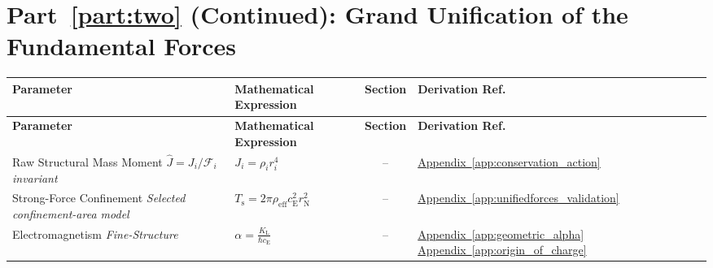\par\ifdim\dimexpr\pagegoal-\pagetotal\relax<12\baselineskip\newpage\fi
\section*{Part~\ref{part:two} (Continued): Grand Unification of the Fundamental Forces}

\vspace{0.5cm}
\noindent
\begin{longtable}{@{} p{4.5cm} p{6cm} c p{4cm} @{}}
\toprule
\textbf{Parameter} & \textbf{Mathematical Expression} & \textbf{Section} & \textbf{Derivation Ref.} \\
\midrule
\endfirsthead
\toprule
\textbf{Parameter} & \textbf{Mathematical Expression} & \textbf{Section} & \textbf{Derivation Ref.} \\
\midrule
\endhead

{\raggedright Raw Structural Mass Moment \newline \textit{$\widehat J=J_i/\mathcal F_i$ invariant}\par} & {\raggedright $J_i = \rho_i r_i^4$\par} & -- & {\raggedright \hyperref[app:conservation_action]{Appendix~\ref*{app:conservation_action}}\par} \\

{\raggedright Strong-Force Confinement \newline \textit{Selected confinement-area model}\par} & {\raggedright $T_{\mathrm{s}} = 2\pi \rho_{\mathrm{eff}} c_{\mathrm{E}}^2 r_{\mathrm{N}}^2$\par} & -- & {\raggedright \hyperref[app:unifiedforces_validation]{Appendix~\ref*{app:unifiedforces_validation}}\par} \\

{\raggedright Electromagnetism \newline \textit{Fine-Structure}\par} & {\raggedright $\alpha = \frac{K_{\mathrm{L}}}{\hbar c_{\mathrm{E}}}$\par} & -- & {\raggedright \hyperref[app:geometric_alpha]{Appendix~\ref*{app:geometric_alpha}} \newline \hyperref[app:origin_of_charge]{Appendix~\ref*{app:origin_of_charge}}\par} \\


\end{longtable}
